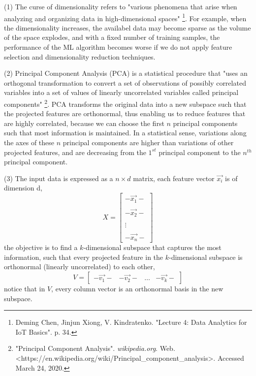 \documentclass[11pt]{article}
\begin{document}
\begin{solution}
\item (1) The curse of dimensionality refers to "various phenomena that arise when analyzing and organizing data in high-dimensional spaces" \footnote{Deming Chen, Jinjun Xiong, V. Kindratenko. "Lecture 4: Data Analytics for IoT Basics". p. 34.}. For example, when the dimensionality increases, the availabel data may become sparse as the volume of the space explodes, and with a fixed number of training samples, the performance of the ML algorithm becomes worse if we do not apply feature selection and dimensionality reduction techniques.
\item (2) Principal Component Analysis (PCA) is a statistical procedure that "uses an orthogonal transformation to convert a set of observations of possibly correlated variables into a set of values of linearly uncorrelated variables called principal components" \footnote{"Principal Component Analysis". \textit{wikipedia.org}. Web. <https://en.wikipedia.org/wiki/Principal\_component\_analysis>. Accessed March 24, 2020.}. PCA transforms the original data into a new subspace such that the projected features are orthonormal, thus enabling us to reduce features that are highly correlated, because we can choose the first $n$ principal components such that most information is maintained. In a statistical sense, variations along the axes of these $n$ principal components are higher than variations of other projected features, and are decreasing from the $1^{st}$ principal component to the $n^{th}$ principal component.
\item (3) The input data is expressed as a $n \times d$ matrix, each feature vector $\vec{x_i}$ is of dimension d,
 \[
X = 
\begin{bmatrix}
  - \vec{x_{1}} -\\
\\
 - \vec{x_{2}} -\\
\\
 \vdots \\
\\
 - \vec{x_{n}} -
\end{bmatrix}
\]
the objective is to find a $k$-dimensional subspace that captures the most information, such that every projected feature in the $k$-dimensional subspace is orthonormal (linearly uncorrelated) to each other,
 \[
V = 
\begin{bmatrix}
  - \vec{v_{1}} - & - \vec{v_{2}} - & \dots & - \vec{v_{k}} -
\end{bmatrix}
\]
notice that in $V$, every column vector is an orthonormal basis in the new subspace.

\end{solution}
\end{document}
